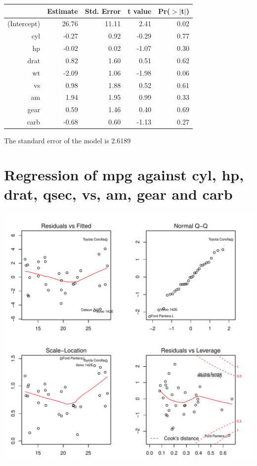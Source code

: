 \documentclass{article}\usepackage[]{graphicx}\usepackage[]{color}
\makeatletter
\def\maxwidth{ %
  \ifdim\Gin@nat@width>\linewidth
    \linewidth
  \else
    \Gin@nat@width
  \fi
}
\newenvironment{knitrout}{}{} %
\makeatother
\begin{document}
\begin{table}[ht]
\centering
\begin{tabular}{rrrrr}
  \hline
 & Estimate & Std. Error & t value & Pr($>$$|$t$|$) \\ 
  \hline
(Intercept) & 26.76 & 11.11 & 2.41 & 0.02 \\ 
  cyl & -0.27 & 0.92 & -0.29 & 0.77 \\ 
  hp & -0.02 & 0.02 & -1.07 & 0.30 \\ 
  drat & 0.82 & 1.60 & 0.51 & 0.62 \\ 
  wt & -2.09 & 1.06 & -1.98 & 0.06 \\ 
  vs & 0.98 & 1.88 & 0.52 & 0.61 \\ 
  am & 1.94 & 1.95 & 0.99 & 0.33 \\ 
  gear & 0.59 & 1.46 & 0.40 & 0.69 \\ 
  carb & -0.68 & 0.60 & -1.13 & 0.27 \\ 
   \hline
\end{tabular}
\end{table}




The standard error of the model is 2.6189

\newpage

\section{Regression of mpg against cyl, hp, drat, qsec, vs, am, gear and carb }
\begin{knitrout}
\color{fgcolor}

{\centering \includegraphics[width=\maxwidth]{figure/lm-cyl-hp-drat-qsec-vs-am-gear-carb} 

}



\end{knitrout}
\end{document}
